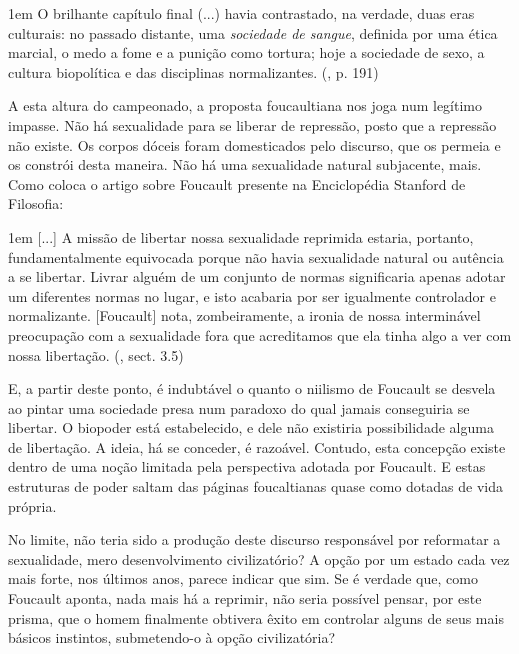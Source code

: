 \documentclass[12pt,a4paper]{article}
\newenvironment{citac}
{
	\begin{addmargin}
		[4cm]{1em} \footnotesize}{\normalfont 
	\end{addmargin}
}
\begin{document}
	\begin{citac}
		O brilhante capítulo final (...) havia contrastado, na verdade, 
		duas eras culturais: no passado distante, uma \textit{sociedade 
		de sangue}, definida por uma ética marcial, o medo a fome e a 
		punição como tortura; hoje a {sociedade de sexo}, a cultura 
		biopolítica e das disciplinas normalizantes. 
		(\cite{merquior}, p. 191)
	\end{citac}
	
	A esta altura do campeonado, a proposta foucaultiana nos joga num 
	legítimo impasse. Não há sexualidade para se liberar de repressão, 
	posto que a repressão não existe. Os corpos dóceis foram domesticados 
	pelo discurso, que os permeia e os constrói desta maneira. Não há uma 
	sexualidade natural subjacente, mais. Como coloca o artigo sobre 
	Foucault presente na Enciclopédia Stanford de Filosofia: 
	
	\begin{citac}
		[...] A missão de libertar nossa sexualidade reprimida estaria, 
		portanto, fundamentalmente equivocada porque não havia sexualidade 
		natural ou autência a se libertar. Livrar alguém de um conjunto de 
		normas significaria apenas adotar um diferentes normas no lugar, 
		e isto acabaria por ser igualmente controlador e normalizante. 
		[Foucault] nota, zombeiramente, a ironia de nossa interminável 
		preocupação com a sexualidade fora que acreditamos que ela tinha 
		algo a ver com nossa libertação. 
		(\cite{sep}, sect. 3.5)
	\end{citac}	
	
	E, a partir deste ponto, é indubtável o quanto o niilismo de Foucault 
	se desvela ao pintar uma sociedade presa num paradoxo do qual jamais 
	conseguiria se libertar. O biopoder está estabelecido, e dele não 
	existiria possibilidade alguma de libertação. A ideia, há se conceder, 
	é razoável. Contudo, esta concepção existe dentro de uma noção limitada 
	pela perspectiva adotada por Foucault. E estas estruturas de poder saltam 
	das páginas foucaltianas quase como dotadas de vida própria. 
	
	No limite, não teria sido a produção deste discurso responsável por 
	reformatar a sexualidade, mero desenvolvimento civilizatório? A opção 
	por um estado cada vez mais forte, nos últimos anos, parece indicar que 
	sim. Se é verdade que, como Foucault aponta, nada mais há a reprimir, 
	não seria possível pensar, por este prisma, que o homem finalmente 
	obtivera êxito em controlar alguns de seus mais básicos instintos, 
	submetendo-o à opção civilizatória? 
	
\end{document}
